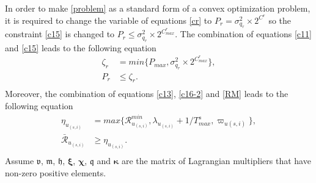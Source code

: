 \documentclass[conference]{IEEEtran}
\begin{document}
In order to make \eqref{problem} as a standard form of a convex optimization problem, it is required to change the variable of equations \eqref{cr} to $P_r = \sigma_{q_r}^2\times 2^{C^r}$ so the constraint 
\eqref{c15} is changed to
 $P_r \leq \sigma_{q_r}^2\times 2^{C^r_{max}}$.
The combination of equations \eqref{c11} and \eqref{c15} leads to the following equation
\begin{equation} \label{pr11}
\begin{split}
\zeta_{r}&= min\{P_{max}, \sigma_{q_r}^2\times 2^{C^r_{max}} \}, \\
P_r &\leq  \zeta_{r}.\\
\end{split}
\end{equation} 
Moreover, the combination of equations \eqref{c13}, \eqref{c16-2} and \eqref{RM} leads to the following equation
\begin{equation}\label{RConstr}
\begin{split}
\eta_{u_{(s,i)}}&= max\{\mathcal{R}_{u_{(s,i)}}^{min}, \lambda_{u_{(s,i)}}+1/T^s_{max}, \varpi_{u(s,i)} \}, \\
\mathcal{\bar{R}}_{u_{(s,i)}} &\geq  \eta_{u_{(s,i)}}.\\
\end{split}
\end{equation}
Assume $\boldsymbol{\mathfrak{v}}$, $\boldsymbol{\mathfrak{m}}$, $\boldsymbol{\mathfrak{h}}$, $\boldsymbol{\xi}$, $\boldsymbol{\chi}$, $\boldsymbol{\mathfrak{q}}$ and $\boldsymbol{ \kappa}$ are the matrix of Lagrangian multipliers that have non-zero positive elements.
\end{document}
